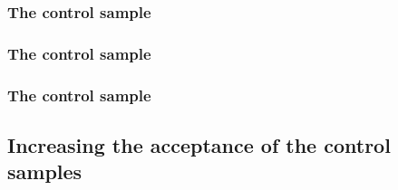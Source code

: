 \subsubsection{The \texorpdfstring{\mj}{muon plus jets} control sample}

\subsubsection{The \texorpdfstring{\mmj}{di-muon plus jets} control sample}

\subsubsection{The \texorpdfstring{\gj}{photon plus jets} control sample}

\subsection{Increasing the acceptance of the control samples\label{sec:larger}}


